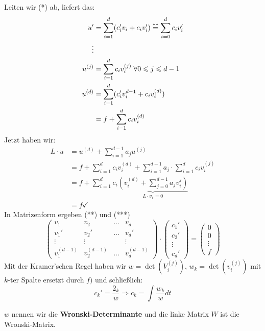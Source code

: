 \documentclass[main.tex]{subfiles}
\begin{document}
\begin{enumerate}
    Leiten wir (*) ab, liefert das:
    $$\begin{aligned}
      u' & = \sum \limits_{i = 1}^d(c_i'v_i + c_i v_i') \stackrel{**}{=} \sum \limits_{i = 0}^d c_i v_i' \\
      \vdots & \\
      u^{(j)} & = \sum \limits_{i = 1}^d c_i v_i^{(j)} \;\forall 0 \leqslant j \leqslant d - 1 \\
      u^{(d)} & = \sum \limits_{i = 1}^d (c_i' v_i^{d-1} + c_i v_i^{(d)}) \\
      & = f + \sum \limits_{i = 1}^d c_i v_i^{(d)}
    \end{aligned}$$
    Jetzt haben wir:
    $$\begin{aligned}
      L \cdot u & = u^{(d)} + \sum \limits_{i = 1}^{d-1} a_j u^{(j)} \\
      & = f + \sum \limits_{i = 1}^d c_i v_i^{(d)} + \sum \limits_{i = 1}^{d-1} a_j \cdot \sum \limits_{i = 1}^d  c_i v_i^{(j)} \\
      & = f + \sum \limits_{i = 1}^d c_i \underbrace{\left(v_i^{(d)} + \sum \limits_{j = 0}^{d-1} a_j v_i^{j} \right)}_{L \cdot v_1 = 0} \\
      & = f \checkmark
    \end{aligned}$$
    In Matrizenform ergeben (**) und (***)
    $$\begin{pmatrix}
      v_1 & v_2 & ... & v_d \\ v_1' & v_2' & ... & v_d' \\ \vdots & \vdots & & \vdots \\ v_1^{(d-1)} & v_2^{(d-1)} & ... & v_d^{(d-1)}
    \end{pmatrix} \cdot \begin{pmatrix}
      c_1' \\ c_2' \\ \vdots \\ c_d'
    \end{pmatrix} = \begin{pmatrix}
      0 \\ 0 \\ \vdots \\ f
    \end{pmatrix}$$
    Mit der Kramer'schen Regel haben wir $w = \det(V_i^{(j)})$, $w_k = \det(v_i^{(j)})$ mit $k$-ter Spalte ersetzt durch $f)$ und schließlich:
    $$c_k' = \dfrac{2_k}{w} \Rightarrow c_k = \int \dfrac{w_k}{w}dt$$
    \begin{Definition}
      $w$ nennen wir die \textbf{Wronski-Determinante} und die linke Matrix $W$ ist die Wronski-Matrix.
    \end{Definition}


\end{enumerate}
\end{document}
